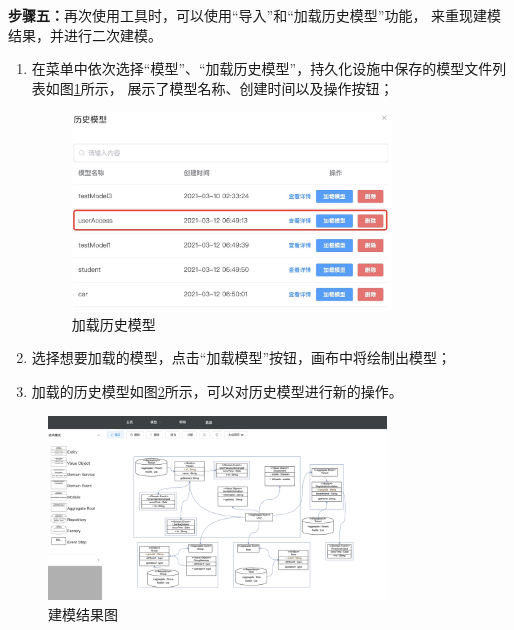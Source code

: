 \textbf{步骤五：}再次使用工具时，可以使用“导入”和“加载历史模型”功能，
来重现建模结果，并进行二次建模。
\begin{enumerate}
    \item 在菜单中依次选择“模型”、“加载历史模型”，持久化设施中保存的模型文件列表如图\ref{reloadModel}所示，
    展示了模型名称、创建时间以及操作按钮；

    \begin{figure}[!htbp] %
        \centering %
        \includegraphics[width=0.8\textwidth]{FIGs/chapter5/reloadModel.png} %
        \caption{加载历史模型} %
        \label{reloadModel} %
    \end{figure}%

    \item 选择想要加载的模型，点击“加载模型”按钮，画布中将绘制出模型；
    \item 加载的历史模型如图\ref{modelResult}所示，可以对历史模型进行新的操作。
\end{enumerate}

\begin{figure}[!htbp] %
    \centering %
    \includegraphics[width=0.8\textwidth]{FIGs/chapter5/modelResult.png} %
    \caption{建模结果图} %
    \label{modelResult} %
\end{figure}%

